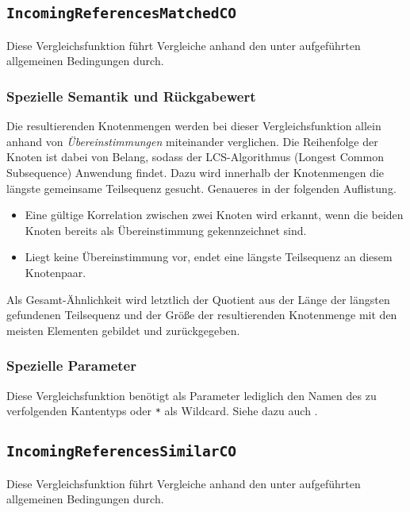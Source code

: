 \newpage
%
%
\subsection{\texttt{IncomingReferencesMatchedCO}}
Diese Vergleichsfunktion führt Vergleiche anhand den unter\mylinebreak{} aufgeführten allgemeinen Bedingungen durch.

\subsubsection*{Spezielle Semantik und Rückgabewert}
Die resultierenden Knotenmengen werden bei dieser Vergleichsfunktion allein anhand von \emph{Übereinstimmungen} miteinander verglichen. Die Reihenfolge der Knoten ist dabei von Belang, sodass der LCS-Algorithmus (Longest Common Subsequence) Anwendung findet. Dazu wird innerhalb der Knotenmengen die längste gemeinsame Teilsequenz gesucht. Genaueres in der folgenden Auflistung.
\begin{itemize}
	\item Eine gültige Korrelation zwischen zwei Knoten wird erkannt, wenn die beiden Knoten bereits als Übereinstimmung gekennzeichnet sind.
	\item Liegt keine Übereinstimmung vor, endet eine längste Teilsequenz an diesem Knotenpaar.
\end{itemize}

Als Gesamt-Ähnlichkeit wird letztlich der Quotient aus der Länge der längsten gefundenen Teilsequenz und der Größe der resultierenden Knotenmenge mit den meisten Elementen gebildet und zurückgegeben.

\subsubsection*{Spezielle Parameter}
Diese Vergleichsfunktion benötigt als Parameter lediglich den Namen des zu verfolgenden Kantentyps oder \texttt{*} als Wildcard. Siehe dazu auch .


%
%
\subsection{\texttt{IncomingReferencesSimilarCO}}
Diese Vergleichsfunktion führt Vergleiche anhand den unter\mylinebreak{} aufgeführten allgemeinen Bedingungen durch.

